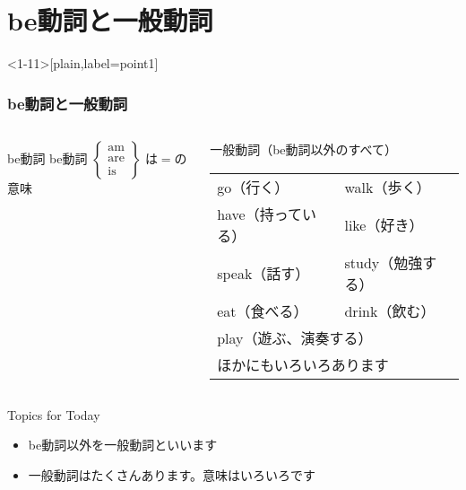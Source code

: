 \documentclass[aspectratio=169,xcolor={dvipsnames,table}]{beamer}
\begin{document}
\section{be動詞と一般動詞}
\begin{frame}<1-11>[plain,label=point1]\frametitle{be動詞と一般動詞}

\begin{columns}
\begin{column}[t]{.38\textwidth}
\begin{block}{be動詞}
be動詞
{\footnotesize
$
 \left\{
\begin{array}{l}
\text{am}\\
\text{are}\\
\text{is}
\end{array}\right\}
$
}
は$=$の意味
\end{block}
\end{column}
\pause
\begin{column}[t]{.52\textwidth}
\begin{alertblock}{一般動詞（be動詞以外のすべて）}
\begin{tabular}[t]{ll}
go（行く）&walk（歩く）\pause\\
have（持っている）&like（好き）\pause\\
speak（話す）&study（勉強する）\pause\\
eat（食べる）& drink（飲む）\pause\\
\multicolumn{2}{l}{play（遊ぶ、演奏する）\pause}\\
\multicolumn{2}{l}{ほかにもいろいろあります}\\
\end{tabular}
\end{alertblock}
\end{column}
\end{columns}


\bigskip
\pause
\begin{exampleblock}{Topics for Today}
\begin{itemize}[<+- |alert@+>]
 \item  be動詞以外を一般動詞といいます
 \item 一般動詞はたくさんあります。意味はいろいろです
\end{itemize}
     \end{exampleblock}

\end{frame}
\end{document}
